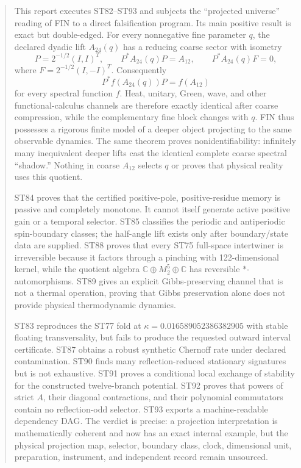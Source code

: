 \documentclass[11pt,a4paper]{article}
\begin{document}
\begin{abstract}
This report executes ST82--ST93 and subjects the ``projected universe'' reading of FIN to a direct falsification program. Its main positive result is exact but double-edged. For every nonnegative fine parameter $q$, the declared dyadic lift $A_{24}(q)$ has a reducing coarse sector with isometry
\[
P=2^{-1/2}(I,I)^T,
\qquad P^*A_{24}(q)P=A_{12},
\qquad P^*A_{24}(q)F=0,
\]
where $F=2^{-1/2}(I,-I)^T$. Consequently
\[
P^*f(A_{24}(q))P=f(A_{12})
\]
for every spectral function $f$. Heat, unitary, Green, wave, and other functional-calculus channels are therefore exactly identical after coarse compression, while the complementary fine block changes with $q$. FIN thus possesses a rigorous finite model of a deeper object projecting to the same observable dynamics. The same theorem proves nonidentifiability: infinitely many inequivalent deeper lifts cast the identical complete coarse spectral ``shadow.'' Nothing in coarse $A_{12}$ selects $q$ or proves that physical reality uses this quotient.

ST84 proves that the certified positive-pole, positive-residue memory is passive and completely monotone. It cannot itself generate active positive gain or a temporal selector. ST85 classifies the periodic and antiperiodic spin-boundary classes; the half-angle lift exists only after boundary/state data are supplied. ST88 proves that every ST75 full-space intertwiner is irreversible because it factors through a pinching with 122-dimensional kernel, while the quotient algebra $\mathbb C\oplus M_2^5\oplus\mathbb C$ has reversible $*$-automorphisms. ST89 gives an explicit Gibbs-preserving channel that is not a thermal operation, proving that Gibbs preservation alone does not provide physical thermodynamic dynamics.

ST83 reproduces the ST77 fold at $\kappa=0.016589052386382905$ with stable floating transversality, but fails to produce the requested outward interval certificate. ST87 obtains a robust synthetic Chernoff rate under declared contamination. ST90 finds many reflection-reduced stationary signatures but is not exhaustive. ST91 proves a conditional local exchange of stability for the constructed twelve-branch potential. ST92 proves that powers of strict $A$, their diagonal contractions, and their polynomial commutators contain no reflection-odd selector. ST93 exports a machine-readable dependency DAG. The verdict is precise: a projection interpretation is mathematically coherent and now has an exact internal example, but the physical projection map, selector, boundary class, clock, dimensional unit, preparation, instrument, and independent record remain unsourced.
\end{abstract}
\end{document}
